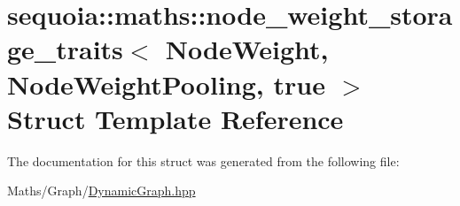 \hypertarget{structsequoia_1_1maths_1_1node__weight__storage__traits_3_01_node_weight_00_01_node_weight_pooling_00_01true_01_4}{}\section{sequoia\+::maths\+::node\+\_\+weight\+\_\+storage\+\_\+traits$<$ Node\+Weight, Node\+Weight\+Pooling, true $>$ Struct Template Reference}
\label{structsequoia_1_1maths_1_1node__weight__storage__traits_3_01_node_weight_00_01_node_weight_pooling_00_01true_01_4}


The documentation for this struct was generated from the following file\+:\begin{DoxyCompactItemize}
\item 
Maths/\+Graph/\mbox{\hyperlink{_dynamic_graph_8hpp}{Dynamic\+Graph.\+hpp}}\end{DoxyCompactItemize}
